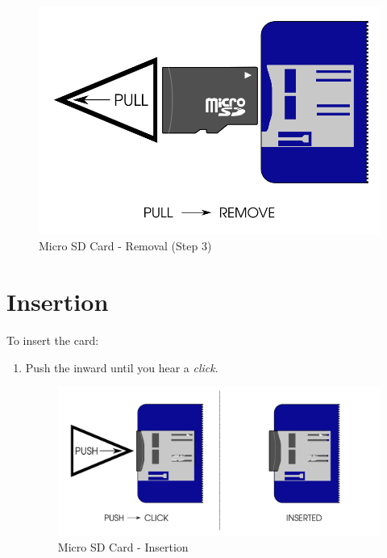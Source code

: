 \begin{enumerate}
\begin{figure}[H]
      \includegraphics{images/micro_sd_card_removal_03.png}
    \caption{Micro SD Card - Removal (Step 3)}
    \end{figure}
\end{enumerate}

\section{Insertion}

To insert the card:

\begin{enumerate}
  \item Push the  inward until you hear a \textit{click}.
    \begin{figure}[H]
    \centering
      \includegraphics{images/micro_sd_card_insertion.png}
    \caption{Micro SD Card - Insertion}
    \end{figure}
\end{enumerate}

